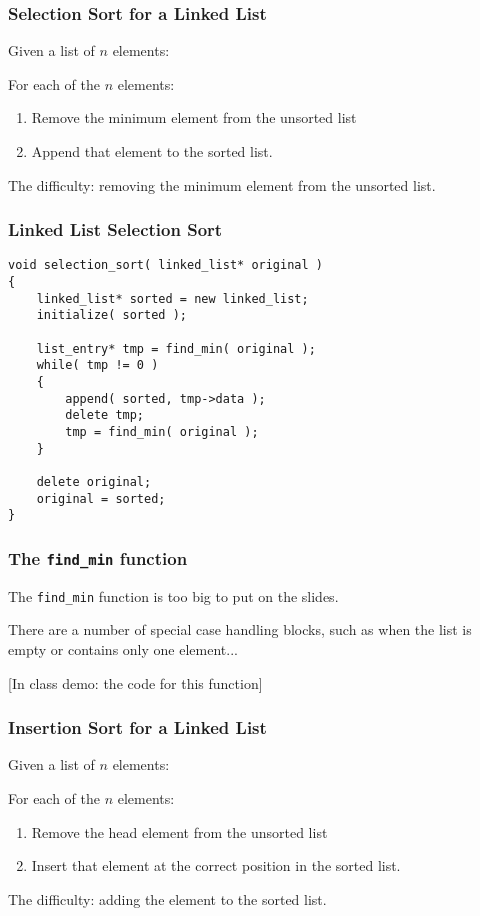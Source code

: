 \begin{frame}
\frametitle{Selection Sort for a Linked List}

Given a list of $n$ elements:

For each of the $n$ elements:
\begin{enumerate}
	\item Remove the minimum element from the unsorted list
	\item Append that element to the sorted list.
\end{enumerate}

The difficulty: removing the minimum element from the unsorted list.

\end{frame}

\begin{frame}[fragile]
\frametitle{Linked List Selection Sort}
{\scriptsize
\begin{verbatim}
void selection_sort( linked_list* original )
{
    linked_list* sorted = new linked_list;
    initialize( sorted );

    list_entry* tmp = find_min( original );
    while( tmp != 0 )	
    {
        append( sorted, tmp->data );
        delete tmp;
        tmp = find_min( original );
    }
    
    delete original;
    original = sorted;
}
\end{verbatim}
}

\end{frame}


\begin{frame}[fragile]
\frametitle{The \texttt{find\_min} function}
The \texttt{find\_min} function is too big to put on the slides.

There are a number of special case handling blocks, such as when the list is empty or contains only one element...

[In class demo: the code for this function]

\end{frame}


\begin{frame}
\frametitle{Insertion Sort for a Linked List}

Given a list of $n$ elements:

For each of the $n$ elements:
\begin{enumerate}
	\item Remove the head element from the unsorted list
	\item Insert that element at the correct position in the sorted list.
\end{enumerate}

The difficulty: adding the element to the sorted list.

\end{frame}

